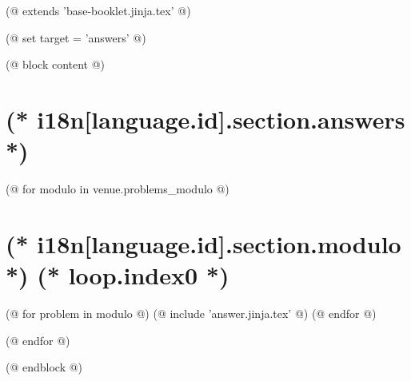 (@ extends 'base-booklet.jinja.tex' @)

(@ set target = 'answers' @)

(@ block content @)
    \thispagestyle{first}
    \afterpage{\globaldefs=1\restoregeometry}

    \vspace*{19mm}

    \section{(* i18n[language.id].section.answers *)}
    \pagestyle{answers}

    (@ for modulo in venue.problems_modulo @)
        \newpage
        \section{(* i18n[language.id].section.modulo *) (* loop.index0 *)}
        (@ for problem in modulo @)
            (@ include 'answer.jinja.tex' @)
        (@ endfor @)

    (@ endfor @)

(@ endblock @)

